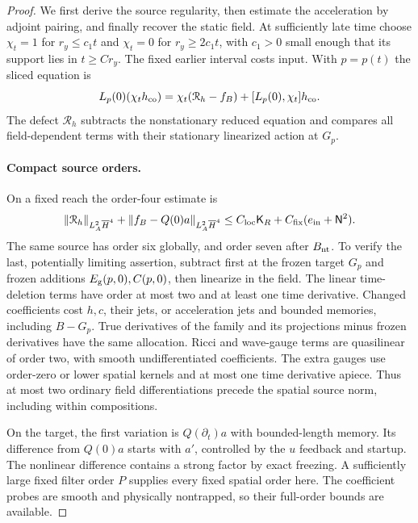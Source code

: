 \begin{proof}
We first derive the source regularity, then estimate the acceleration by
adjoint pairing, and finally recover the static field.  At sufficiently late
time choose $\chi_t=1$ for $r_y\le c_1t$ and $\chi_t=0$ for
$r_y\ge2c_1t$, with $c_1>0$ small enough that its support lies in $t\ge Cr_y$.
The fixed earlier interval costs input.  With $p=p(t)$ the sliced equation is
\begin{equation}\label{co2:sliced-equation}
 L_p(0)(\chi_t h_{\rm co})
   =\chi_t(\mathcal R_h-f_B)+[L_p(0),\chi_t]h_{\rm co}.
\end{equation}
The defect $\mathcal R_h$ subtracts the nonstationary reduced equation and
compares all field-dependent terms with their stationary linearized action at
$G_p$.

\paragraph{Compact source orders.}
On a fixed reach the order-four estimate is
\begin{equation}\label{co2:compact-defect}
 \|\mathcal R_h\|_{L^2_A\overline H^4}
 +\|f_B-Q(0)a\|_{L^2_A\overline H^4}
 \le C_{\rm loc}\mathsf K_R+C_{\rm fix}(e_{\rm in}+\mathsf N^2).
\end{equation}
The same source has order six globally, and order seven after $B_{\rm nt}$.
To verify the last, potentially limiting assertion, subtract first at the
frozen target $G_p$ and frozen additions $E_{\rm g}(p,0),C(p,0)$, then
linearize in the field. The linear time-deletion terms have order at
most two and at least one time derivative.
Changed coefficients cost $h,c$, their jets, or acceleration jets and bounded
memories, including $B-G_p$.  True derivatives of the family and its projections
minus frozen derivatives have the same allocation.  Ricci and wave-gauge terms
are quasilinear of order two, with smooth undifferentiated coefficients.
The extra gauges use order-zero or lower spatial kernels and at most one
time derivative apiece.  Thus at most two ordinary field differentiations
precede the spatial source norm, including within compositions.

On the target, the first variation is $Q(\partial_t)a$ with bounded-length
memory.  Its difference from $Q(0)a$ starts with $a'$, controlled by the
$u$ feedback and startup.  The nonlinear difference contains a strong factor
by exact freezing.  A sufficiently large fixed filter order $P$ supplies every
fixed spatial order here.  The coefficient probes are smooth and physically
nontrapped, so their full-order bounds are available.


\end{proof}
